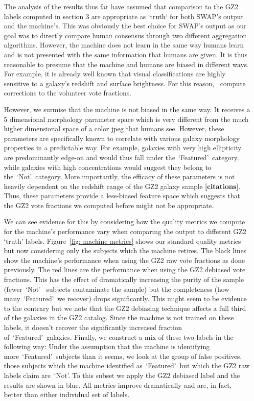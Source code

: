 \documentclass[twocolumn]{aastex6}
\newcommand{\feat}{`Featured'}
\newcommand{\notfeat}{`Not'}
\begin{document}
The analysis of the results thus far have assumed that comparison to the GZ2
 labels computed in section 3 are appropriate as `truth` for both SWAP's output and
the machine's. This was obviously the best choice for SWAP's output as our goal 
was to directly compare human consensus through two different aggregation algorithms.
However, the machine does not learn in the same way humans learn and is not 
presented with the same information that humans are given. It is thus reasonable
to presume that the machine and humans are biased in different ways. For example,
it is already well known that visual classifications are highly sensitive to a galaxy's
 redshift and surface brightness. For this reason,~\cite{Willett2013} compute 
corrections to the volunteer vote fractions. 

However, we surmise that the machine is not biased in the same way. It receives
 a 5 dimensional morphology parameter space  which is very different from the much higher
dimensional space of a color jpeg that humans see. However, these parameters are
specifically known to correlate with various galaxy morphology properties in a 
predictable way. For example, galaxies with very high ellipticity are predominantly 
edge-on and would thus fall under the~\feat~category, while galaxies with 
high concentrations would suggest they belong to the~\notfeat~category.  
More importantly, the efficacy of these parameters is not heavily dependent on 
the redshift range of the GZ2 galaxy sample \textbf{[citations]}. 
Thus, these parameters provide a less-biased feature
space which suggests that the GZ2 vote fractions we computed before might not be
appropriate. 

We can see evidence for this by considering how the quality metrics we compute for 
the machine's performance vary when comparing the output to different GZ2 `truth' labels. 
Figure~\ref{fig: machine metrics} shows our standard quality metrics but now 
considering only the subjects which the machine retires. The black lines show 
the machine's performance when using the GZ2 raw vote fractions as done previously.
The red lines are the performance when using the GZ2 debiased vote fractions. 
This has the effect of dramatically increasing the purity of the sample (fewer~\notfeat~
subjects contaminate the sample) but the completeness (how many~\feat~we recover)
drops significantly. This might seem to be evidence to the contrary but we note that
the GZ2 debiasing technique affects a full third of the galaxies in the GZ2 catalog. 
Since the machine is not trained on these labels, it doesn't recover the significantly
increased fraction of~\feat~galaxies. Finally, we construct a mix of these
two labels in the following way: Under the assumption that the machine is identifying
more~\feat~subjects than it seems, we look at the group of false positives, those 
subjects which the machine identified as~\feat~but which the GZ2 raw labels claim
are~\notfeat. To this subset we apply the GZ2 debiased label and the results are shown in blue. 
All metrics improve dramatically and are, in fact, better than either individual set of labels. 
\end{document}

